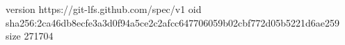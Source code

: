 version https://git-lfs.github.com/spec/v1
oid sha256:2ca46db8ecfe3a3d0f94a5ce2c2afcc647706059b02cbf772d05b5221d6ae259
size 271704
